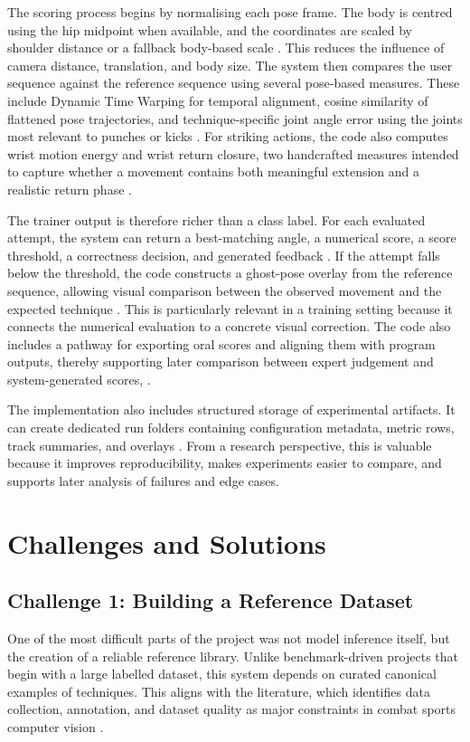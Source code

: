 \documentclass[12pt]{article}
\begin{document}
The scoring process begins by normalising each pose frame. The body is centred using the hip midpoint when available, and the coordinates are scaled by shoulder distance or a fallback body-based scale \cite{projectActionRecognition}. This reduces the influence of camera distance, translation, and body size. The system then compares the user sequence against the reference sequence using several pose-based measures. These include Dynamic Time Warping for temporal alignment, cosine similarity of flattened pose trajectories, and technique-specific joint angle error using the joints most relevant to punches or kicks \cite{projectActionRecognition}. For striking actions, the code also computes wrist motion energy and wrist return closure, two handcrafted measures intended to capture whether a movement contains both meaningful extension and a realistic return phase \cite{projectActionRecognition}.

The trainer output is therefore richer than a class label. For each evaluated attempt, the system can return a best-matching angle, a numerical score, a score threshold, a correctness decision, and generated feedback \cite{projectActionRecognition}. If the attempt falls below the threshold, the code constructs a ghost-pose overlay from the reference sequence, allowing visual comparison between the observed movement and the expected technique \cite{projectActionRecognition}. This is particularly relevant in a training setting because it connects the numerical evaluation to a concrete visual correction. The code also includes a pathway for exporting oral scores and aligning them with program outputs, thereby supporting later comparison between expert judgement and system-generated scores, \cite{projectEvaluateOralScores}.

The implementation also includes structured storage of experimental artifacts. It can create dedicated run folders containing configuration metadata, metric rows, track summaries, and overlays \cite{projectActionRecognition}. From a research perspective, this is valuable because it improves reproducibility, makes experiments easier to compare, and supports later analysis of failures and edge cases.

\section{Challenges and Solutions}
\subsection{Challenge 1: Building a Reference Dataset}
One of the most difficult parts of the project was not model inference itself, but the creation of a reliable reference library. Unlike benchmark-driven projects that begin with a large labelled dataset, this system depends on curated canonical examples of techniques. This aligns with the literature, which identifies data collection, annotation, and dataset quality as major constraints in combat sports computer vision \cite{quinn2024automation,quinn2025yolo}.
\end{document}
